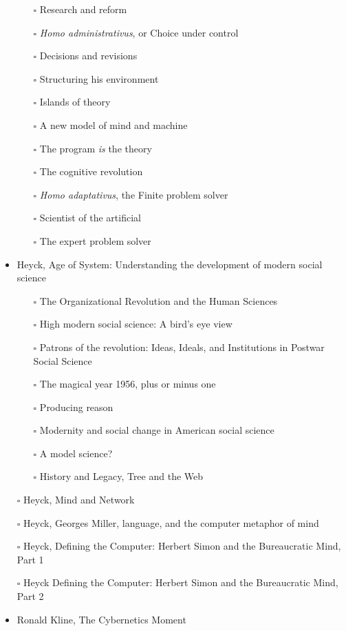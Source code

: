 \documentclass[paper=B6,portrait,twoside=true,twocolumn=false,headinclude=true,footinclude=false,fontsize=12,BCOR=10mm,DIV=calc,pagesize=auto,titlepage=firstiscover,mpinclude=false,headings=normal,headings=twolinechapter,open=right,toc=graduated,chapterprefix=false,numbers=endperiod,parskip=half+]{scrbook}
\theoremstyle{definition}
\begin{document}
\begin{itemize}
\begin{itemize}
\item[{$\square$}] Research and reform
\item[{$\square$}] \emph{Homo administrativus}, or Choice under control
\item[{$\square$}] Decisions and revisions
\item[{$\square$}] Structuring his environment
\item[{$\square$}] Islands of theory
\item[{$\square$}] A new model of mind and machine
\item[{$\square$}] The program \emph{is} the theory
\item[{$\square$}] The cognitive revolution
\item[{$\square$}] \emph{Homo adaptativus}, the Finite problem solver
\item[{$\square$}] Scientist of the artificial
\item[{$\square$}] The expert problem solver
\end{itemize}
\item\relax [0/8] Heyck, Age of System: Understanding the development of modern social science
\begin{itemize}
\item[{$\square$}] The Organizational Revolution and the Human Sciences
\item[{$\square$}] High modern social science: A bird's eye view
\item[{$\square$}] Patrons of the revolution: Ideas, Ideals, and Institutions in Postwar Social Science
\item[{$\square$}] The magical year 1956, plus or minus one
\item[{$\square$}] Producing reason
\item[{$\square$}] Modernity and social change in American social science
\item[{$\square$}] A model science?
\item[{$\square$}] History and Legacy, Tree and the Web
\end{itemize}
\item[{$\square$}] Heyck, Mind and Network
\item[{$\square$}] Heyck, Georges Miller, language, and the computer metaphor of mind
\item[{$\square$}] Heyck, Defining the Computer: Herbert Simon and the Bureaucratic Mind, Part 1
\item[{$\square$}] Heyck Defining the Computer: Herbert Simon and the Bureaucratic Mind, Part 2
\item\relax [0/9] Ronald Kline, The Cybernetics Moment

\end{itemize}
\end{document}
